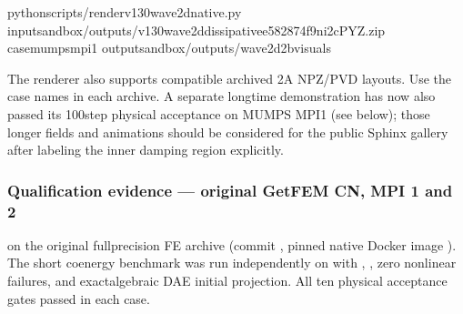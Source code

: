 \documentclass[letterpaper,10pt,english]{sphinxmanual}
\begin{document}
\begin{sphinxVerbatim}[commandchars=\\\{\}]
pythonscripts/render\PYGZhy{}v130\PYGZhy{}wave2d\PYGZhy{}native.py
\PYGZhy{}\PYGZhy{}inputsandbox/outputs/v130\PYGZhy{}wave2d\PYGZhy{}dissipative\PYGZhy{}e582874f\PYGZhy{}9ni2cPYZ.zip
\PYGZhy{}\PYGZhy{}casemumps\PYGZus{}mpi1
\PYGZhy{}\PYGZhy{}outputsandbox/outputs/wave2d\PYGZhy{}2b\PYGZhy{}visuals
\end{sphinxVerbatim}

\sphinxAtStartPar
The renderer also supports compatible archived 2A
NPZ/PVD layouts. Use the case names in each archive.
A separate long\sphinxhyphen{}time demonstration has now also
passed its 100\sphinxhyphen{}step physical acceptance on MUMPS
MPI1 (see below); those longer fields and animations
should be considered for the public Sphinx gallery
after labeling the inner damping region explicitly.


\subsubsection{Qualification evidence — original GetFEM CN, MPI 1 and 2}
\label{\detokenize{examples/wave_coenergy:qualification-evidence-original-getfem-cn-mpi-1-and-2}}
\sphinxAtStartPar
{} on the original full\sphinxhyphen{}precision FE
archive 
(commit ,
pinned native Docker image ).
The short co\sphinxhyphen{}energy benchmark was run independently
on  with , , zero nonlinear failures, and exact\sphinxhyphen{}algebraic
DAE initial projection. All ten physical acceptance
gates passed in each case.
\end{document}
